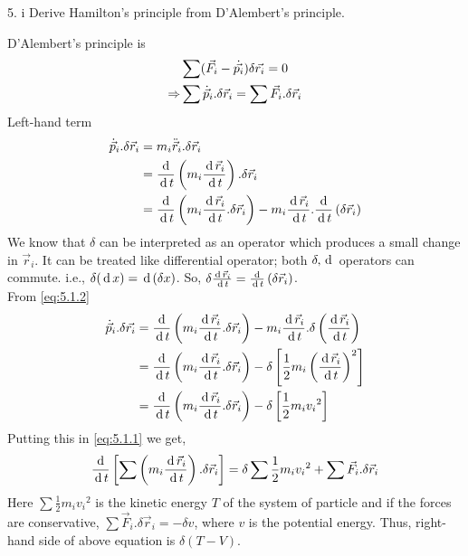 \documentclass[12pt]{article}
\begin{document}
\begin{prob}{5. i}
    Derive Hamilton's principle from D'Alembert's principle.
\end{prob}
\begin{soln}
    D'Alembert's principle is
    \begin{align}
        &\sum (\vec{F_i}-\dot{\vec{p_i}})\delta \vec{r_i}=0\notag\\
        \Rightarrow& \sum \dot{\vec{p}}_i.\delta \vec{r}_i=\sum \vec{F}_i.\delta \vec{r}_i \label{eq:5.1.1}
    \end{align}
    Left-hand term
    \begin{align}
        \dot{\vec{p}}_i.\delta \vec{r}_i&=m_i\ddot{\vec{r}}_i.\delta\vec{r}_i\notag\\
        &=\frac{\,\mathrm{d}\,}{\,\mathrm{d}\, t}\left( m_i\frac{\,\mathrm{d}\,\vec{r}_i}{\,\mathrm{d}\, t} \right).\delta\vec{r}_i\notag\\
        &=\frac{\,\mathrm{d}\,}{\,\mathrm{d}\, t}\left( m_i\frac{\,\mathrm{d}\,\vec{r}_i}{\,\mathrm{d}\, t}.\delta\vec{r}_i \right)-m_i\frac{\,\mathrm{d}\,\vec{r}_i}{\,\mathrm{d}\, t}.\frac{\,\mathrm{d}\,}{\,\mathrm{d}\, t}\left( \delta \vec{r}_i \right)\label{eq:5.1.2}
    \end{align}
    We know that \(\delta\) can be interpreted as an operator which produces a small change in \(\vec{r}_i\). It can be treated like differential operator; both \(\delta,\,\mathrm{d}\,\) operators can commute. i.e., \(\delta(\,\mathrm{d}\, x)=\,\mathrm{d}\,(\delta x)\). So,
    \(\delta \frac{\,\mathrm{d}\,\vec{r}_i}{\,\mathrm{d}\, t}=\frac{\,\mathrm{d}\,}{\,\mathrm{d}\, t}\left( \delta\vec{r}_i \right)\).\\
    From \eqref{eq:5.1.2}
    \begin{align*}
        \dot{\vec{p}}_i.\delta \vec{r_i}&=\frac{\,\mathrm{d}\,}{\,\mathrm{d}\, t}\left( m_i\frac{\,\mathrm{d}\,\vec{r}_i}{\,\mathrm{d}\, t}.\delta\vec{r}_i \right)-m_i\frac{\,\mathrm{d}\,\vec{r}_i}{\,\mathrm{d}\, t}.\delta\left(  \frac{\,\mathrm{d}\,\vec{r}_i}{\,\mathrm{d}\, t} \right)\\
        &=\frac{\,\mathrm{d}\,}{\,\mathrm{d}\, t}\left( m_i\frac{\,\mathrm{d}\,\vec{r}_i}{\,\mathrm{d}\, t}.\delta\vec{r}_i \right)-\delta \left[ \frac{1}{2}m_i \left( \frac{\,\mathrm{d}\,\vec{r}_i}{\,\mathrm{d}\, t} \right)^2\right]\\
        &=\frac{\,\mathrm{d}\,}{\,\mathrm{d}\, t}\left( m_i\frac{\,\mathrm{d}\,\vec{r}_i}{\,\mathrm{d}\, t}.\delta\vec{r}_i \right)-\delta \left[ \frac{1}{2}m_i {v_i}^2\right]
    \end{align*}
    Putting this in \eqref{eq:5.1.1} we get,
    \[
        \frac{\,\mathrm{d}\,}{\,\mathrm{d}\, t}\left[ \sum \left( m_i \frac{\,\mathrm{d}\,\vec{r}_i}{\,\mathrm{d}\, t} \right).\delta \vec{r}_i \right]=\delta \sum \frac{1}{2}m_i {v_i}^2+\sum \vec{F}_i.\delta \vec{r}_i
    \]
    Here \(\sum \frac{1}{2}m_i {v_i}^2\) is the kinetic energy \(T\) of the system of particle and if the forces are conservative, \(\sum \vec{F}_i.\delta \vec{r}_i=-\delta v\), where \(v\) is the potential energy. Thus, right-hand side of above equation is \(\delta(T-V)\).\\

\end{soln}
\end{document}
